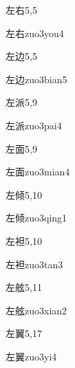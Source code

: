 \begin{entry}{左右}{5,5}
  \begin{phonetics}{左右}{zuo3you4}
  \end{phonetics}
\end{entry}

\begin{entry}{左边}{5,5}
  \begin{phonetics}{左边}{zuo3bian5}
  \end{phonetics}
\end{entry}

\begin{entry}{左派}{5,9}
  \begin{phonetics}{左派}{zuo3pai4}
  \end{phonetics}
\end{entry}

\begin{entry}{左面}{5,9}
  \begin{phonetics}{左面}{zuo3mian4}
  \end{phonetics}
\end{entry}

\begin{entry}{左倾}{5,10}
  \begin{phonetics}{左倾}{zuo3qing1}
  \end{phonetics}
\end{entry}

\begin{entry}{左袒}{5,10}
  \begin{phonetics}{左袒}{zuo3tan3}
  \end{phonetics}
\end{entry}

\begin{entry}{左舷}{5,11}
  \begin{phonetics}{左舷}{zuo3xian2}
  \end{phonetics}
\end{entry}

\begin{entry}{左翼}{5,17}
  \begin{phonetics}{左翼}{zuo3yi4}
  \end{phonetics}
\end{entry}

